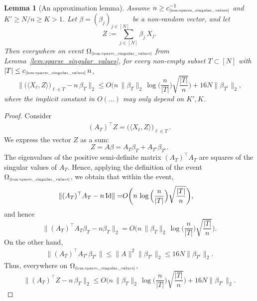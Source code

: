 \documentclass[11pt]{amsart}
\newtheorem{lemma}[theorem]{Lemma}
\theoremstyle{definition}
\theoremstyle{plain}
\def\Id{{\rm Id}}
\begin{document}
\begin{lemma}[An approximation lemma]\label{lem:approxlemma}
Assume $n\geq c_{\text{\tiny\ref{lem:sparse_singular_values}}}^{-1}$ and
$K'\geq N/n\geq K>1$.
Let $\beta=(\beta_j)_{j\in [N]}$
be a non-random vector, and let
$$
Z:=\sum_{j\in[N]}\beta_j\,X_j.
$$
Then everywhere on event
$\Omega_{\text{\tiny\ref{lem:sparse_singular_values}}}$ from Lemma~\ref{lem:sparse_singular_values},
for every non-empty subset $T\subset[N]$ with
$|T|\leq c_{\text{\tiny\ref{lem:sparse_singular_values}}}\,n$,
$$
\big\|\big(\langle X_\ell, Z \rangle\big)_{\ell \in T }
-n\,\beta_T
\big\|_2
\leq
  O
  \bigg(n\,\|\beta_T\|_2\,\log\Big(\frac{n}{|T|}\Big) \sqrt{\frac{|T|}{n}}\bigg)
  +16 N \|\beta _{T^c}\|_2,
$$
where the implicit constant in $O(\dots)$ may only depend on $K',K$.
\end{lemma}
\begin{proof}
Consider 
\begin{align*}
    (A_T)^\top Z
= \big(\langle X_\ell, Z \rangle\big)_{\ell \in T }\,.
\end{align*}
We express the vector $Z$ as a sum: 
$$Z = A \beta  = A_{T } \beta _{T } + A_{T ^c} \beta_{T^c}.$$
The eigenvalues of the positive semi-definite matrix 
$(A_T)^\top A_{T }$ are squares of the singular values
of $A_T$. Hence, applying the definition of the event
$\Omega_{\text{\tiny\ref{lem:sparse_singular_values}}}$,
we obtain that within the event,
\begin{align*}
  \|(A_T)^\top A_{T } - n\,\Id\|
=&
  O
  \bigg(n\,\log\Big(\frac{n}{|T|}\Big) \sqrt{\frac{|T|}{n}}\bigg),
\end{align*}
and hence
$$
\Big\| (A_T)^\top A_{T } \beta _{T } 
  - n \beta _{T }\Big\|_2=
  O
  \bigg(n\,\|\beta_T\|_2\,\log\Big(\frac{n}{|T|}\Big) \sqrt{\frac{|T|}{n}}\bigg).
$$
On the other hand,
\begin{align*}
  \Big\|
  (A_T)^\top A_{T^c} \beta _{T^c}\Big\|
\le 
  \|A\|^2 \|\beta _{T^c}\|_2
\leq 16 N \|\beta _{T^c}\|_2.
\end{align*}
Thus, everywhere on $\Omega_{\text{\tiny\ref{lem:sparse_singular_values}}}$,
$$
\big\|(A_T)^\top Z
-n\,\beta_T
\big\|_2
\leq
  O
  \bigg(n\,\|\beta_T\|_2\,\log\Big(\frac{n}{|T|}\Big) \sqrt{\frac{|T|}{n}}\bigg)
  +16 N \|\beta _{T^c}\|_2.
$$
\end{proof}
\end{document}
